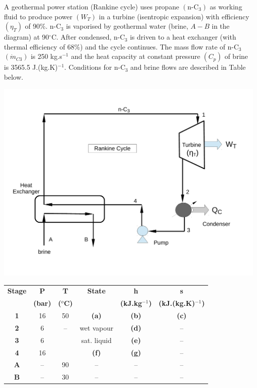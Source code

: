 \documentclass[calculator,steamtables,refrigeranttables,psychrometricchart,datasheet,solutions]{exam}
\begin{document}
\begin{question}
%
A geothermal power station (Rankine cycle) uses propane $\left(\text{n-C}_{3}\right)$ as working fluid to produce power $\left(W_{T}\right)$ in a turbine (isentropic expansion) with efficiency $\left(\eta_{T}\right)$ of 90$\%$. n-C$_{3}$ is vaporised by geothermal water (brine, $A-B$ in the diagram) at 90$^{\circ}$C. After condensed, n-C$_{3}$ is driven to a heat exchanger (with thermal efficiency of 68$\%$) and the cycle continues. The mass flow rate of n-C$_{3}$ $\left(\dot{m}_{C3}\right)$ is 250 kg.s$^{-1}$ and the heat capacity at constant pressure $\left(C_{p}\right)$ of brine is 3565.5 J.(kg.K)$^{-1}$. Conditions for n-C$_{3}$ and brine flows are described in Table below.
\begin{center}
\includegraphics[width=10.cm,height=7.cm,clip]{./Pics/RankineCycle}
\end{center}
\begin{center}
\begin{tabular} {||c | c c c c c || }
\hline\hline
{\bf Stage} & {\bf P}    & {\bf T}        & {\bf State}    & {\bf h}             & {\bf s}                  \\
            & {\bf (bar)}& {\bf ($^{o}$C)} &               & {\bf (kJ.kg$^{-1}$)} & {\bf (kJ.(kg.K)$^{-1}$)}  \\
\hline\hline
 {\bf 1 }   & 16         & 50             &   {\bf (a)}    & {\bf (b)}           & {\bf (c)}                \\
 {\bf 2 }   & 6          &  --            &   wet vapour   & {\bf (d)}           & --                       \\
 {\bf 3 }   & 6          &                &   sat. liquid  & {\bf (e)}           & --                       \\
 {\bf 4 }   & 16         &                &   {\bf (f)}    & {\bf (g)}           & --                       \\
 {\bf A }   & --         & 90             &   --           & --                  & --                       \\
 {\bf B }   & --         & 30             &   --           & --                  & --                       \\
 \hline\hline
\end{tabular}
\end{center}


\end{question}
\end{document}
